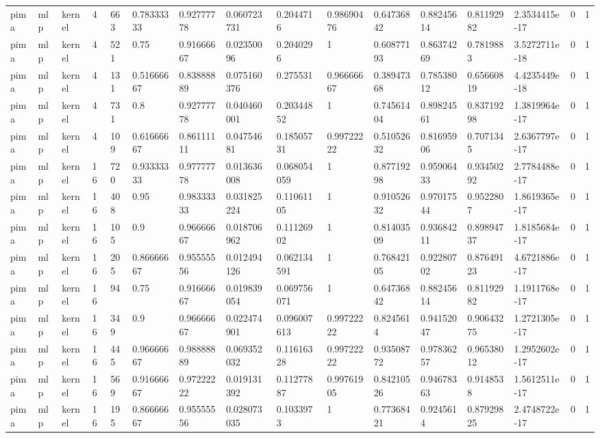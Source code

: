 \begin{tabular}{llllllllllllllll}
pima & mlp & kernel & 4 & 663 & 0.78333333 & 0.92777778 & 0.060723731 & 0.2044716 & 0.98690476 & 0.64736842 & 0.88245614 & 0.81192982 & 2.3534415e-17 & 0 & 1 \\
pima & mlp & kernel & 4 & 521 & 0.75 & 0.91666667 & 0.02350096 & 0.2040296 & 1 & 0.60877193 & 0.86374269 & 0.7819883 & 3.5272711e-18 & 0 & 1 \\
pima & mlp & kernel & 4 & 131 & 0.51666667 & 0.83888889 & 0.075160376 & 0.275531 & 0.96666667 & 0.38947368 & 0.78538012 & 0.65660819 & 4.4235449e-18 & 0 & 1 \\
pima & mlp & kernel & 4 & 731 & 0.8 & 0.92777778 & 0.040460001 & 0.20344852 & 1 & 0.74561404 & 0.89824561 & 0.83719298 & 1.3819964e-17 & 0 & 1 \\
pima & mlp & kernel & 4 & 109 & 0.61666667 & 0.86111111 & 0.04754681 & 0.18505731 & 0.99722222 & 0.51052632 & 0.81695906 & 0.7071345 & 2.6367797e-17 & 0 & 1 \\
pima & mlp & kernel & 16 & 720 & 0.93333333 & 0.97777778 & 0.013636008 & 0.068054059 & 1 & 0.87719298 & 0.95906433 & 0.93450292 & 2.7784488e-17 & 0 & 1 \\
pima & mlp & kernel & 16 & 408 & 0.95 & 0.98333333 & 0.031825224 & 0.11061105 & 1 & 0.91052632 & 0.97017544 & 0.9522807 & 1.8619365e-17 & 0 & 1 \\
pima & mlp & kernel & 16 & 105 & 0.9 & 0.96666667 & 0.018706962 & 0.11126902 & 1 & 0.81403509 & 0.93684211 & 0.89894737 & 1.8185684e-17 & 0 & 1 \\
pima & mlp & kernel & 16 & 205 & 0.86666667 & 0.95555556 & 0.012494126 & 0.062134591 & 1 & 0.76842105 & 0.92280702 & 0.87649123 & 4.6721886e-17 & 0 & 1 \\
pima & mlp & kernel & 16 & 94 & 0.75 & 0.91666667 & 0.019839054 & 0.069756071 & 1 & 0.64736842 & 0.88245614 & 0.81192982 & 1.1911768e-17 & 0 & 1 \\
pima & mlp & kernel & 16 & 349 & 0.9 & 0.96666667 & 0.022474901 & 0.096007613 & 0.99722222 & 0.8245614 & 0.94152047 & 0.90643275 & 1.2721305e-17 & 0 & 1 \\
pima & mlp & kernel & 16 & 445 & 0.96666667 & 0.98888889 & 0.069352032 & 0.11616328 & 0.99722222 & 0.93508772 & 0.97836257 & 0.96538012 & 1.2952602e-17 & 0 & 1 \\
pima & mlp & kernel & 16 & 569 & 0.91666667 & 0.97222222 & 0.019131392 & 0.11277887 & 0.99761905 & 0.84210526 & 0.94678363 & 0.9148538 & 1.5612511e-17 & 0 & 1 \\
pima & mlp & kernel & 16 & 195 & 0.86666667 & 0.95555556 & 0.028073035 & 0.1033973 & 1 & 0.77368421 & 0.9245614 & 0.87929825 & 2.4748722e-17 & 0 & 1 \\

\end{tabular}
